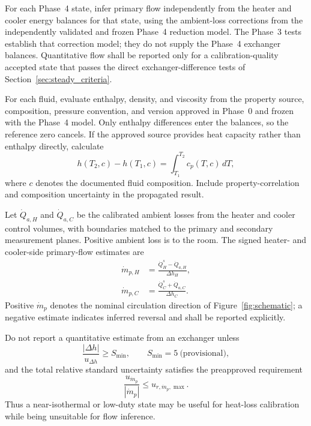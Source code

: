 \documentclass[11pt]{article}
\newcommand{\QHs}{\dot Q_{H}^{s}}
\newcommand{\QCs}{\dot Q_{C}^{s}}
\newcommand{\mdotp}{\dot m_{p}}
\newcommand{\mdotpH}{\dot m_{p,H}}
\newcommand{\mdotpC}{\dot m_{p,C}}
\begin{document}
For each Phase~4 state, infer primary flow independently from the heater and cooler energy balances for that state, using the ambient-loss corrections from the independently validated and frozen Phase~4 reduction model. The Phase~3 tests establish that correction model; they do not supply the Phase~4 exchanger balances. Quantitative flow shall be reported only for a calibration-quality accepted state that passes the direct exchanger-difference tests of Section~\ref{sec:steady_criteria}.

For each fluid, evaluate enthalpy, density, and viscosity from the property source, composition, pressure convention, and version approved in Phase~0 and frozen with the Phase~4 model. Only enthalpy differences enter the balances, so the reference zero cancels. If the approved source provides heat capacity rather than enthalpy directly, calculate
\begin{equation}
    h(T_2,c)-h(T_1,c)
    =
    \int_{T_1}^{T_2}c_p(T,c)\,dT,
\end{equation}
where $c$ denotes the documented fluid composition. Include property-correlation and composition uncertainty in the propagated result.

Let $\dot Q_{a,H}$ and $\dot Q_{a,C}$ be the calibrated ambient losses from the heater and cooler control volumes, with boundaries matched to the primary and secondary measurement planes. Positive ambient loss is to the room. The signed heater- and cooler-side primary-flow estimates are
\begin{align}
    \mdotpH
    &=
    \frac{\QHs-\dot Q_{a,H}}
    {\Delta h_H},
    \label{eq:mdot_h}\\
    \mdotpC
    &=
    \frac{\QCs+\dot Q_{a,C}}
    {\Delta h_C}.
    \label{eq:mdot_c}
\end{align}
Positive $\mdotp$ denotes the nominal circulation direction of Figure~\ref{fig:schematic}; a negative estimate indicates inferred reversal and shall be reported explicitly.

Do not report a quantitative estimate from an exchanger unless
\begin{equation}
    \frac{|\Delta h|}{u_{\Delta h}}
    \geq
    S_{\min},
    \qquad
    S_{\min}=5\ \text{(provisional)},
    \label{eq:enthalpy_conditioning}
\end{equation}
and the total relative standard uncertainty satisfies the preapproved requirement
\begin{equation}
    \frac{u_{\mdotp}}{|\mdotp|}
    \leq
    u_{r,\mdotp,\max}.
    \label{eq:flow_uncertainty_limit}
\end{equation}
Thus a near-isothermal or low-duty state may be useful for heat-loss calibration while being unsuitable for flow inference.
\end{document}
